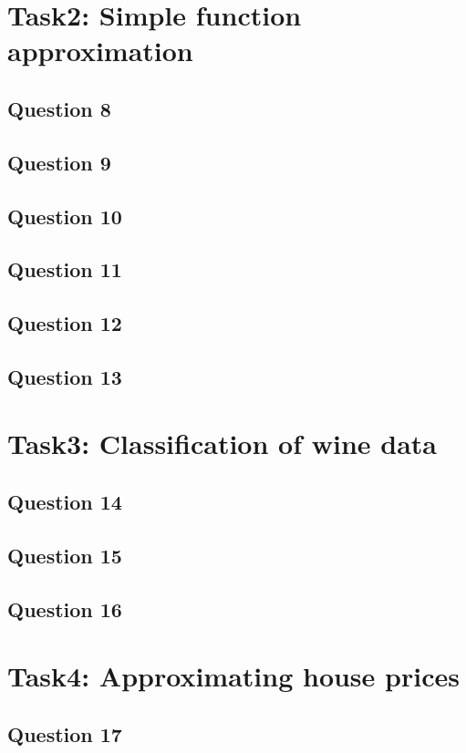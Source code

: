 \documentclass[a4paper]{article}
\begin{document}
\section{Task2: Simple function approximation}

\subsection*{Question 8}
\subsection*{Question 9}
\subsection*{Question 10}
\subsection*{Question 11}
\subsection*{Question 12}
\subsection*{Question 13}

\section{Task3: Classification of wine data}
\subsection*{Question 14}
\subsection*{Question 15}
\subsection*{Question 16}

\section{Task4: Approximating house prices}

\subsection*{Question 17}
\end{document}
